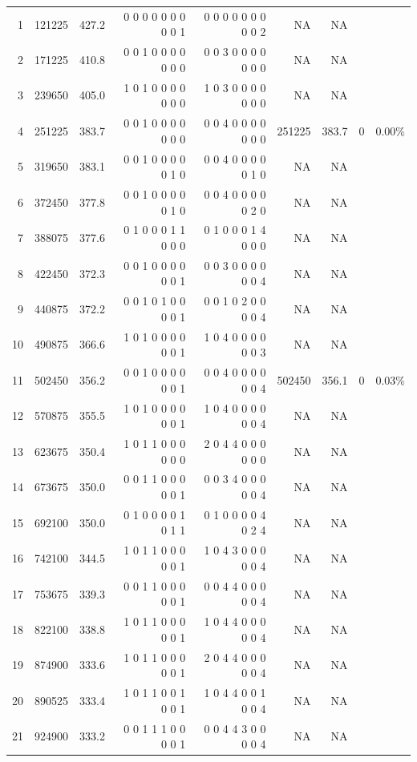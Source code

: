\documentclass[10pt,journal,compsoc]{IEEEtran}
\begin{document}
\begin{table}[h]
{\begin{tabular}{|*{9}{r|}}
1	&121225	&   427.2	&0 0 0 0 0 0 0 0 0 1	&0 0 0 0 0 0 0 0 0 2	&			NA	&NA&&\\
2	&171225	&   410.8	&0 0 1 0 0 0 0 0 0 0	&0 0 3 0 0 0 0 0 0 0	&			NA	&NA&&\\
3	&239650	&   405.0	&1 0 1 0 0 0 0 0 0 0	&1 0 3 0 0 0 0 0 0 0	&			NA	&NA&&\\
4	&251225	&   383.7	&0 0 1 0 0 0 0 0 0 0	&0 0 4 0 0 0 0 0 0 0	&	      \cellcolor{blizzardblue} 251225&	\cellcolor{blizzardblue}383.7	&\cellcolor{blizzardblue}0	&\cellcolor{blizzardblue}0.00\%\\
5	&319650	&   383.1	&0 0 1 0 0 0 0 0 1 0	&0 0 4 0 0 0 0 0 1 0	&			NA	&NA&&\\
6	&372450	&   377.8	&0 0 1 0 0 0 0 0 1 0	&0 0 4 0 0 0 0 0 2 0	&			NA	&NA&&\\
7	&388075	&   377.6	&0 1 0 0 0 1 1 0 0 0	&0 1 0 0 0 1 4 0 0 0	&			NA	&NA&&\\
8	&422450	&   372.3	&0 0 1 0 0 0 0 0 0 1	&0 0 3 0 0 0 0 0 0 4	&			NA	&NA&&\\
9	&440875	&   372.2	&0 0 1 0 1 0 0 0 0 1	&0 0 1 0 2 0 0 0 0 4	&			NA	&NA&&\\
10	&490875	&   366.6	&1 0 1 0 0 0 0 0 0 1	&1 0 4 0 0 0 0 0 0 3	&			NA	&NA&&\\
11	&502450	&   356.2	&0 0 1 0 0 0 0 0 0 1	&0 0 4 0 0 0 0 0 0 4	&	      \cellcolor{blizzardblue} 502450	&\cellcolor{blizzardblue}356.1	&\cellcolor{blizzardblue}0	&\cellcolor{blizzardblue}0.03\%\\
12	&570875	&   355.5	&1 0 1 0 0 0 0 0 0 1	&1 0 4 0 0 0 0 0 0 4	&			NA	&NA&&\\
13	&623675	&   350.4	&1 0 1 1 0 0 0 0 0 0	&2 0 4 4 0 0 0 0 0 0	&			NA	&NA&&\\
14	&673675	&   350.0	&0 0 1 1 0 0 0 0 0 1	&0 0 3 4 0 0 0 0 0 4	&			NA	&NA&&\\
15	&692100	&   350.0	&0 1 0 0 0 0 1 0 1 1	&0 1 0 0 0 0 4 0 2 4	&			NA	&NA&&\\
16	&742100	&   344.5	&1 0 1 1 0 0 0 0 0 1	&1 0 4 3 0 0 0 0 0 4	&			NA	&NA&&\\
17	&753675	&   339.3	&0 0 1 1 0 0 0 0 0 1	&0 0 4 4 0 0 0 0 0 4	&			NA	&NA&&\\
18	&822100	&   338.8	&1 0 1 1 0 0 0 0 0 1	&1 0 4 4 0 0 0 0 0 4	&			NA	&NA&&\\
19	&874900	&   333.6	&1 0 1 1 0 0 0 0 0 1	&2 0 4 4 0 0 0 0 0 4	&			NA	&NA&&\\
20	&890525	&   333.4	&1 0 1 1 0 0 1 0 0 1	&1 0 4 4 0 0 1 0 0 4	&			NA	&NA&&\\
21	&924900	&   333.2	&0 0 1 1 1 0 0 0 0 1	&0 0 4 4 3 0 0 0 0 4	&			NA	&NA&&\\

\end{tabular}}
\end{table}
\end{document}
